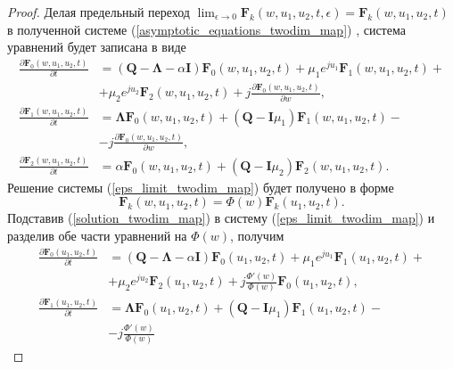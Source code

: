 \begin{proof}
	Делая предельный переход $ \lim_{\epsilon \xrightarrow{} 0}\boldsymbol{F}_{k}(w,u_{1},u_{2},t,\epsilon) = \boldsymbol{F}_{k}(w,u_{1},u_{2},t)$  в полученной системе (\ref{asymptotic_equations_twodim_map}) , система уравнений будет записана в виде
	\begin{equation} \label{eps_limit_twodim_map}
		\begin{split}
			\frac{{\partial \boldsymbol{F}_{0}(w,u_{1},u_{2},t)}}{{\partial t}} &= (\boldsymbol{Q}-\boldsymbol{\Lambda}-\alpha\boldsymbol{I})\boldsymbol{F}_{0}(w,u_{1},u_{2},t) + \mu_{1} e^{ju_{1}}\boldsymbol{F}_{1}(w,u_{1},u_{2},t)  + \\  &+ \mu_{2}e^{ju_{2}}\boldsymbol{F}_{2}(w,u_{1},u_{2},t) + j
			\frac{{\partial \boldsymbol{F}_{0}(w,u_{1},u_{2},t)}}{{\partial w}},
			\\
			\frac{{\partial \boldsymbol{F}_{1}(w,u_{1},u_{2},t)}}{{\partial t}} &= \boldsymbol{\Lambda} \boldsymbol{F}_{0}(w,u_{1},u_{2},t) +  (\boldsymbol{Q} - \boldsymbol{I}\mu_{1})\boldsymbol{F}_{1}(w,u_{1},u_{2},t) -\\ &- j
			\frac{{\partial \boldsymbol{F}_{0}(w,u_{1},u_{2},t)}}{{\partial w}},
			\\
			\frac{{\partial \boldsymbol{F}_{2}(w,u_{1},u_{2},t)}}{{\partial t}} &= \alpha \boldsymbol{F}_{0}(w,u_{1},u_{2},t) + (\boldsymbol{Q} - \boldsymbol{I}\mu_{2})\boldsymbol{F}_{2}(w,u_{1},u_{2},t).
		\end{split}
	\end{equation}   
	Решение системы (\ref{eps_limit_twodim_map}) будет получено в форме
	\begin{equation} \label{solution_twodim_map}
		\boldsymbol{F}_{k}(w,u_{1},u_{2},t) = \Phi(w)\boldsymbol{F}_{k}(u_{1},u_{2},t).
	\end{equation}  
	Подставив (\ref{solution_twodim_map}) в систему (\ref{eps_limit_twodim_map}) и разделив обе части уравнений на $\Phi(w)$, получим
	\begin{equation} \label{preresult_twodim_map}
	\begin{split}
		\frac{{\partial \boldsymbol{F}_{0}(u_{1},u_{2},t)}}{{\partial t}} &= (\boldsymbol{Q}-\boldsymbol{\Lambda}-\alpha\boldsymbol{I})\boldsymbol{F}_{0}(u_{1},u_{2},t) + \mu_{1} e^{ju_{1}}\boldsymbol{F}_{1}(u_{1},u_{2},t)  + \\  &+ \mu_{2}e^{ju_{2}}\boldsymbol{F}_{2}(u_{1},u_{2},t) + j\frac{\Phi'(w) }{\Phi(w)}
		 \boldsymbol{F}_{0}(u_{1},u_{2},t),
		\\
		\frac{{\partial \boldsymbol{F}_{1}(u_{1},u_{2},t)}}{{\partial t}} &= \boldsymbol{\Lambda} \boldsymbol{F}_{0}(u_{1},u_{2},t) +  (\boldsymbol{Q} - \boldsymbol{I}\mu_{1})\boldsymbol{F}_{1}(u_{1},u_{2},t) -\\ &- j\frac{\Phi'(w) }{\Phi(w)}

\end{split}
\end{equation}
\end{proof}
